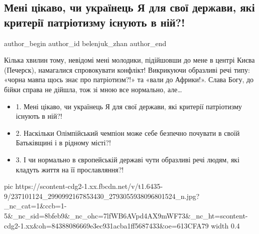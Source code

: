  
 
 
 
 
 
\subsection{Мені цікаво, чи українець Я для свої держави, які критерії патріотизму існують в ній?!}
\label{sec:13_08_2021.fb.belenjuk_zhan.1.napadenie}
 
\ifcmt
 author_begin
   author_id belenjuk_zhan
 author_end
\fi

Кілька хвилин тому, невідомі мені молодики, підійшовши до мене в центрі Києва
(Печерск), намагалися  спровокувати конфлікт! Викрикуючи образливі речі типу:
«чорна мавпа щось знає про патріотизм?!» та «вали до Африки!».  Слава Богу, до
бійки справа не дійшла, тож зі мною все нормально, але…

\begin{itemize}
  \item 1. Мені цікаво, чи українець Я для свої держави, які критерії патріотизму існують в ній?! 
  \item 2. Наскільки Олімпійський чемпіон може себе безпечно почувати в своїй Батьківщині і в рідному місті?! 
  \item 3. І чи нормально в європейській державі чути образливі речі людям, які кладуть життя на її прославляння?!
\end{itemize}

\ifcmt
  pic https://scontent-cdg2-1.xx.fbcdn.net/v/t1.6435-9/237101124_2990992167853430_2793055938096801524_n.jpg?_nc_cat=1&ccb=1-5&_nc_sid=8bfeb9&_nc_ohc=7lfWB6AVpd4AX9mWF73&_nc_ht=scontent-cdg2-1.xx&oh=84388086669e3ec931acba1ff5687433&oe=613CFA79
  width 0.4
\fi


